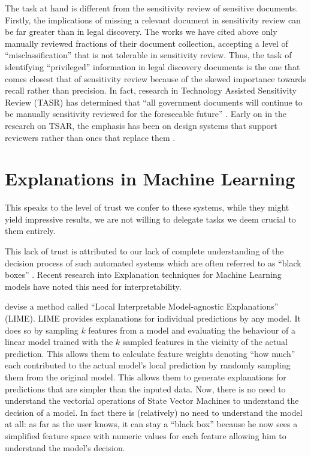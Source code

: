 \documentclass[\version]{l4proj}
\begin{document}
The task at hand is different from the sensitivity review of sensitive documents.
Firstly, the implications of missing a relevant document in sensitivity review can be far greater than in legal discovery.
The works we have cited above only manually reviewed fractions of their document collection, accepting a level of ``misclassification'' that is not tolerable in sensitivity review.
Thus, the task of identifying ``privileged'' information in legal discovery documents is the one that comes closest that of sensitivity review \autocite{berardiSemiAutomatedTextClassification2015} because of the skewed importance towards recall rather than precision.
In fact, research in Technology Assisted Sensitivity Review (TASR) has determined that ``all government documents will continue to be manually sensitivity reviewed for the foreseeable future'' \autocite[1]{mcdonaldHowSensitivityClassification2019}.
Early on in the research on TSAR, the emphasis has been on design systems that support reviewers rather than ones that replace them \autocite{mcdonaldClassifierDigitalSensitivity2014}.

\section{Explanations in Machine Learning}

This speaks to the level of trust we confer to these systems, while they might yield impressive results, we are not willing to delegate tasks we deem crucial to them entirely.

This lack of trust is attributed to our lack of complete understanding of the decision process of such automated systems which are often referred to as ``black boxes'' \autocite{ribeiroWhyShouldTrust2016}.
Recent research into Explanation techniques for Machine Learning models have noted this need for interpretability.

\textcite{ribeiroWhyShouldTrust2016} devise a method called ``Local Interpretable Model-agnostic Explanations'' (LIME).
LIME provides explanations for individual predictions by any model.
It does so by sampling $k$ features from a model and evaluating the behaviour of a linear model trained with the $k$ sampled features in the vicinity of the actual prediction.
This allows them to calculate feature weights denoting ``how much'' each contributed to the actual model's local prediction by randomly sampling them from the original model.
This allows them to generate explanations for predictions that are simpler than the inputed data.
Now, there is no need to understand the vectorial operations of State Vector Machines to understand the decision of a model.
In fact there is (relatively) no need to understand the model at all: as far as the user knows, it can stay a ``black box'' because he now sees a simplified feature space with numeric values for each feature allowing him to understand the model's decision.
\end{document}
